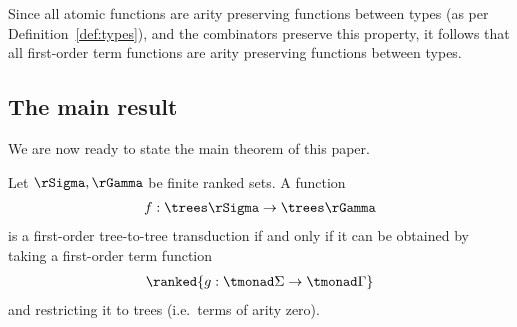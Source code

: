 Since all atomic functions are arity preserving functions between types (as per Definition~\ref{def:types}), and the combinators preserve this property, it follows that all first-order term functions are arity preserving functions between types. 

\subsection{The main result}
We are now ready to state the main theorem of this paper. 

\begin{theorem}\label{thm:main}
    Let $\rSigma,\rGamma$ be finite ranked sets. A function 
    \begin{align*}
        f : \trees \rSigma \to \trees \rGamma
    \end{align*}
    is a first-order tree-to-tree transduction if and only if it can be obtained by taking a first-order term function
    \begin{align*}
        \ranked {g : \tmonad \Sigma \to \tmonad \Gamma}
    \end{align*}
    and restricting it to trees (i.e.~terms of arity zero).
\end{theorem}








